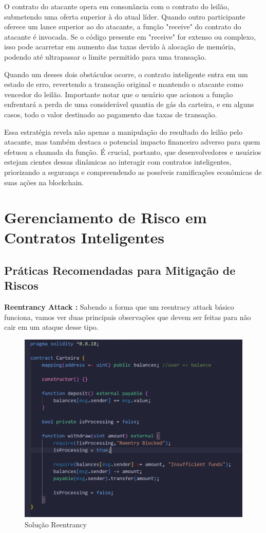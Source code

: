 O contrato do atacante opera em consonância com o contrato do leilão, submetendo uma oferta superior à do atual líder. Quando outro participante oferece um lance superior ao do atacante, a função "receive" do contrato do atacante é invocada. Se o código presente em "receive" for extenso ou complexo, isso pode acarretar em aumento das taxas devido à alocação de memória, podendo até ultrapassar o limite permitido para uma transação.

Quando um desses dois obstáculos ocorre, o contrato inteligente entra em um estado de erro, revertendo a transação original e mantendo o atacante como vencedor do leilão. Importante notar que o usuário que acionou a função enfrentará a perda de uma considerável quantia de gás da carteira, e em alguns casos, todo o valor destinado ao pagamento das taxas de transação.

Essa estratégia revela não apenas a manipulação do resultado do leilão pelo atacante, mas também destaca o potencial impacto financeiro adverso para quem efetuou a chamada da função. É crucial, portanto, que desenvolvedores e usuários estejam cientes dessas dinâmicas ao interagir com contratos inteligentes, priorizando a segurança e compreendendo as possíveis ramificações econômicas de suas ações na blockchain.

\section{Gerenciamento de Risco em Contratos Inteligentes}



\subsection{Práticas Recomendadas para Mitigação de Riscos}

\textbf{Reentrancy Attack \cite{RA}: }Sabendo a forma que um reentracy attack básico funciona, vamos ver duas principais observações que devem ser feitas para não cair em um ataque desse tipo.
\begin{figure}
    \centering
    \includegraphics[width=0.5\linewidth]{figuras/RASolution.png}
    \caption{Solução Reentrancy}
    \label{fig:enter-label}
\end{figure}

